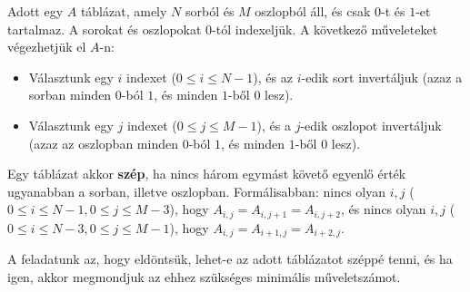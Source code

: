 \usepackage{xcolor}
\usepackage{afterpage}
\usepackage{pifont,mdframed}
\usepackage[bottom]{footmisc}

\makeatletter
\gdef\this@inputfilename{input}
\gdef\this@outputfilename{output}
\makeatother

\lstset{
  basicstyle=\ttfamily,
  columns=fullflexible
}

\setcounter{@subtaskcounter}{-1}


Adott egy $A$ táblázat, amely $N$ sorból és $M$ oszlopból áll, és csak $0$-t és $1$-et tartalmaz. A sorokat és oszlopokat $0$-tól indexeljük.
A következő műveleteket végezhetjük el $A$-n:


\begin{itemize}
  \item Választunk egy $i$ indexet ($0 \le i \le N - 1$), és az $i$-edik sort invertáljuk (azaz a sorban minden $0$-ból $1$, és minden $1$-ből $0$ lesz).
  \item Választunk egy $j$ indexet ($0 \le j \le M - 1$), és a $j$-edik oszlopot invertáljuk (azaz az oszlopban minden $0$-ból $1$, és minden $1$-ből $0$ lesz).
\end{itemize}


Egy táblázat akkor \textbf{szép}, ha nincs három egymást követő egyenlő érték ugyanabban a sorban, illetve oszlopban.
Formálisabban: nincs olyan $i, j$ ($0 \le i \le N - 1, 0 \le j \le M - 3$), hogy $A_{i, j} = A_{i, j + 1} = A_{i, j + 2}$,
és nincs olyan $i, j$ ($0 \le i \le N - 3, 0 \le j \le M - 1$), hogy $A_{i, j} = A_{i + 1, j} = A_{i + 2, j}$.

A feladatunk az, hogy eldöntsük, lehet-e az adott táblázatot széppé tenni, és ha igen, akkor megmondjuk az ehhez szükséges minimális műveletszámot.

